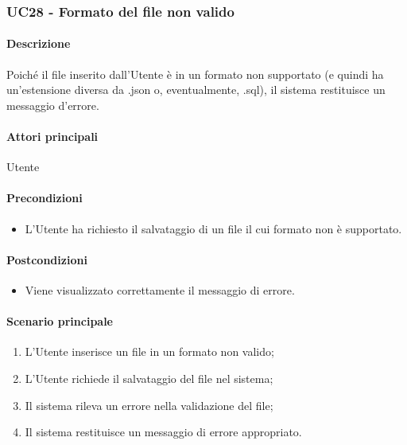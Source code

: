 \subsubsection{UC28 - Formato del file non valido}\label{UC28}
\paragraph*{Descrizione}
Poiché il file inserito dall'Utente è in un formato non supportato (e quindi ha un'estensione diversa da .json o, eventualmente, .sql), il sistema restituisce un messaggio d'errore.

\paragraph*{Attori principali}
Utente

\paragraph*{Precondizioni}
\begin{itemize}
  \item L'Utente ha richiesto il salvataggio di un file il cui formato non è supportato.
\end{itemize}

\paragraph*{Postcondizioni}
\begin{itemize}
  \item Viene visualizzato correttamente il messaggio di errore.
\end{itemize}

\paragraph*{Scenario principale}
\begin{enumerate}
  \item L'Utente inserisce un file in un formato non valido;
  \item L'Utente richiede il salvataggio del file nel sistema;
  \item Il sistema rileva un errore nella validazione del file;
  \item Il sistema restituisce un messaggio di errore appropriato.
\end{enumerate}
